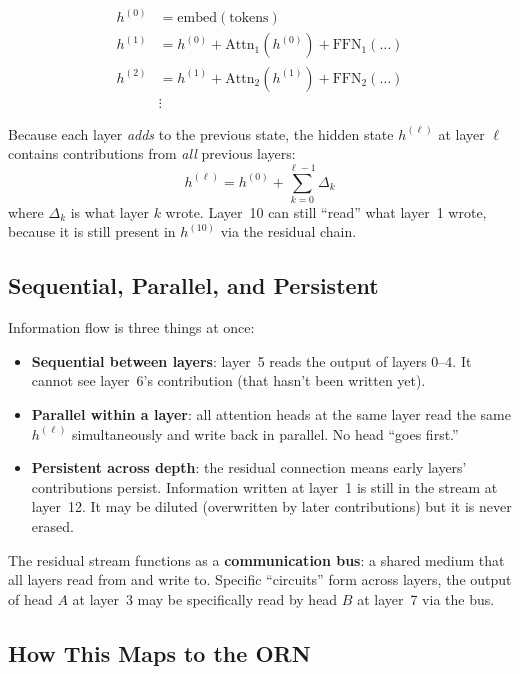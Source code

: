 \documentclass[11pt, a4paper]{article}
\theoremstyle{remark}
\begin{document}
\begin{align}
    h^{(0)} &= \text{embed}(\text{tokens}) \\
    h^{(1)} &= h^{(0)} + \text{Attn}_1(h^{(0)}) + \text{FFN}_1(\ldots) \\
    h^{(2)} &= h^{(1)} + \text{Attn}_2(h^{(1)}) + \text{FFN}_2(\ldots) \\
    &\vdots
\end{align}

Because each layer \emph{adds} to the previous state, the hidden state $h^{(\ell)}$ at layer $\ell$ contains contributions from \emph{all} previous layers:
\[
    h^{(\ell)} = h^{(0)} + \sum_{k=0}^{\ell-1} \Delta_k
\]
where $\Delta_k$ is what layer $k$ wrote.
Layer~10 can still ``read'' what layer~1 wrote, because it is still present in $h^{(10)}$ via the residual chain.

\subsection{Sequential, Parallel, and Persistent}

Information flow is three things at once:

\begin{itemize}[nosep]
    \item \textbf{Sequential between layers}: layer~5 reads the output of layers 0--4.
    It cannot see layer~6's contribution (that hasn't been written yet).
    \item \textbf{Parallel within a layer}: all attention heads at the same layer read the same $h^{(\ell)}$ simultaneously and write back in parallel.
    No head ``goes first.''
    \item \textbf{Persistent across depth}: the residual connection means early layers' contributions persist.
    Information written at layer~1 is still in the stream at layer~12.
    It may be diluted (overwritten by later contributions) but it is never erased.
\end{itemize}

The residual stream functions as a \textbf{communication bus}: a shared medium that all layers read from and write to.
Specific ``circuits'' form across layers, the output of head $A$ at layer~3 may be specifically read by head $B$ at layer~7 via the bus.

\subsection{How This Maps to the ORN}
\end{document}
